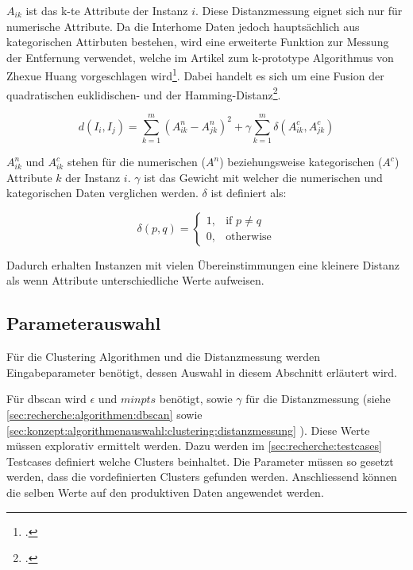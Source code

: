 $A_{ik}$ ist das k-te Attribute der Instanz $i$. 
Diese Distanzmessung eignet sich nur für numerische Attribute.
Da die Interhome Daten jedoch hauptsächlich aus kategorischen Attirbuten bestehen, wird  eine erweiterte Funktion zur Messung der Entfernung verwendet, welche im Artikel zum k-prototype Algorithmus von Zhexue Huang vorgeschlagen wird\footcite{clustering_numeric_and_categorical_values}.
Dabei handelt es sich um eine Fusion der quadratischen euklidischen- und der Hamming-Distanz\footcite{data_mining_concepts_and_techniques}.

\begin{equation} \label{eq:recherche:clusteranalysis:2}
d(I_i, I_j) = \sum_{k=1}^{m} (A^n_{ik} - A^n_{jk})^2 + \gamma \sum_{k=1}^{m} \delta(A^c_{ik}, A^c_{jk})
\end{equation}

$A^n_{ik}$ und $A^c_{ik}$ stehen für die numerischen ($A^n$) beziehungsweise kategorischen ($A^c$) Attribute $k$ der Instanz $i$. 
$\gamma$ ist das Gewicht mit welcher die numerischen und kategorischen Daten verglichen werden.
$\delta$ ist definiert als:

\begin{equation} \label{eq:recherche:clusteranalysis:3}
\delta(p,q)= 
\begin{cases}
1,				& \text{if } p \neq q\\
0,              & \text{otherwise}
\end{cases}
\end{equation}

Dadurch erhalten Instanzen mit vielen Übereinstimmungen eine kleinere Distanz als wenn Attribute unterschiedliche Werte aufweisen.

\subsection{Parameterauswahl}
\label{sec:konzept:parameterauswahl}
Für die Clustering Algorithmen und die Distanzmessung werden Eingabeparameter benötigt, dessen Auswahl in diesem Abschnitt erläutert wird.

Für \gls{dbscan} wird $\epsilon$ und $minpts$ benötigt, sowie $\gamma$ für die Distanzmessung (siehe \cref{sec:recherche:algorithmen:dbscan}  sowie \cref{sec:konzept:algorithmenauswahl:clustering:distanzmessung} ). Diese Werte müssen explorativ ermittelt werden. Dazu werden im \cref{sec:recherche:testcases} Testcases definiert welche Clusters beinhaltet. Die Parameter müssen so gesetzt werden, dass die vordefinierten Clusters gefunden werden. Anschliessend können die selben Werte auf den produktiven Daten angewendet werden.

